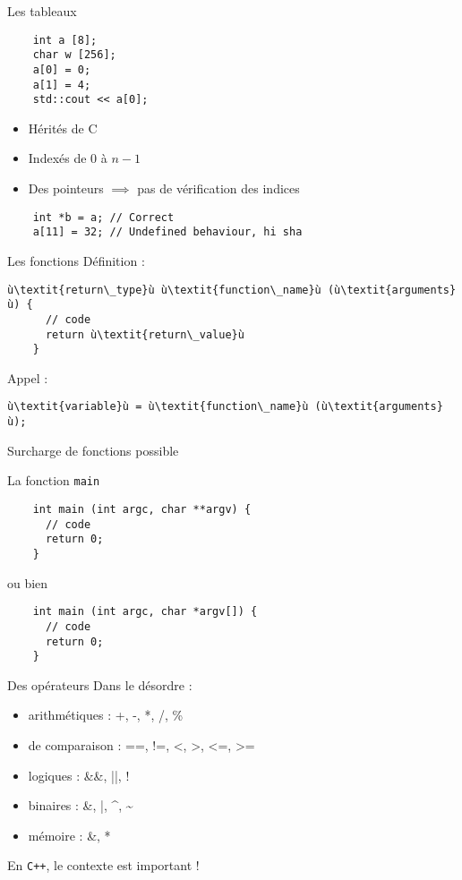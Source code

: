 \begin{frame}[fragile]{Les tableaux}
  \begin{lstlisting}
    int a [8];
    char w [256];
    a[0] = 0;
    a[1] = 4;
    std::cout << a[0];
  \end{lstlisting}

  \begin{itemize}
  \item Hérités de C
  \item Indexés de 0 à $n-1$
  \item Des pointeurs $\implies$ pas de vérification des indices
  \end{itemize}

  \begin{lstlisting}
    int *b = a; // Correct
    a[11] = 32; // Undefined behaviour, hi sha
  \end{lstlisting}  
\end{frame}

\begin{frame}[fragile]{Les fonctions}
  Définition :
  \begin{lstlisting}[escapechar=ù]
    ù\textit{return\_type}ù ù\textit{function\_name}ù (ù\textit{arguments}ù) {
      // code
      return ù\textit{return\_value}ù
    }
  \end{lstlisting}

  Appel :
  \begin{lstlisting}[escapechar=ù]
    ù\textit{variable}ù = ù\textit{function\_name}ù (ù\textit{arguments}ù);
  \end{lstlisting}

  Surcharge de fonctions possible
  
\end{frame}

\begin{frame}[fragile]{La fonction \texttt{main}}
  \begin{lstlisting}
    int main (int argc, char **argv) {
      // code
      return 0;
    }
  \end{lstlisting}
 ou bien
  \begin{lstlisting}
    int main (int argc, char *argv[]) {
      // code
      return 0;
    }
  \end{lstlisting}
\end{frame}

\begin{frame}{Des opérateurs}
  Dans le désordre :
  \begin{itemize}
  \item arithmétiques : +, -, *, /, \%
  \item de comparaison : ==, !=, <, >, <=, >=
  \item logiques : \&\&, ||, !
  \item binaires : \&, |, \^{}, \~{}
  \item mémoire : \&, *
  \end{itemize}

  En \texttt{C++}, le contexte est important !
\end{frame}

